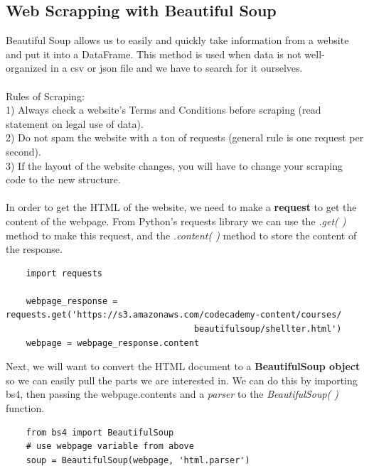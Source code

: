 \documentclass[11pt, a4paper]{article}
\begin{document}
\begin{spacing}{1.1}
	\subsection{Web Scrapping with Beautiful Soup}
	Beautiful Soup allows us to easily and quickly take information from a website and put it into a DataFrame. This method is used when data is not well-organized in a csv or json file and we have to search for it ourselves. \\~\\
	Rules of Scraping: \\
	1) Always check a website’s Terms and Conditions before scraping (read statement on legal use of data). \\
	2) Do not spam the website with a ton of requests (general rule is one request per second). \\
	3) If the layout of the website changes, you will have to change your scraping code to the new structure. \\~\\
	In order to get the HTML of the website, we need to make a \textbf{request} to get the content of the webpage. From Python's requests library we can use the \textit{.get( )} method to make this request, and the \textit{.content( )} method to store the content of the response.
	\begin{lstlisting}
	import requests
	
	webpage_response = requests.get('https://s3.amazonaws.com/codecademy-content/courses/
	                                 beautifulsoup/shellter.html')
	webpage = webpage_response.content \end{lstlisting}\vspace*{1mm}
	Next, we will want to convert the HTML document to a \textbf{BeautifulSoup object} so we can easily pull the parts we are interested in. We can do this by importing bs4, then passing the webpage.contents and a \textit{parser} to the \textit{BeautifulSoup( )} function.
	\begin{lstlisting}
	from bs4 import BeautifulSoup
	# use webpage variable from above
	soup = BeautifulSoup(webpage, 'html.parser') \end{lstlisting} \newpage
	

\end{spacing}
\end{document}
